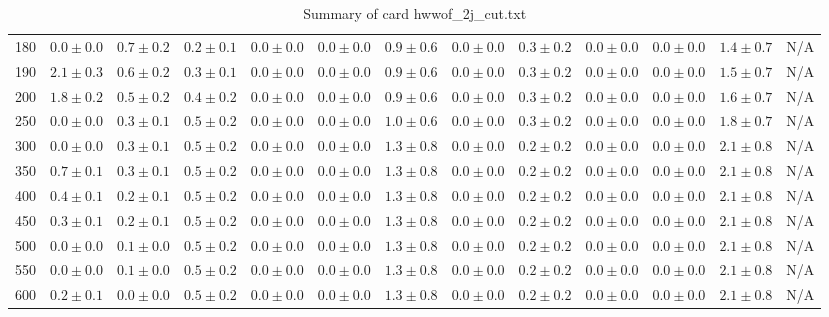\begin{table}
{\begin{center}
\begin{tabular}{l | c c | c c c c c c c c  | c c}
180 & $0.0\pm0.0$ & $0.7\pm0.2$ & $0.2\pm0.1$ & $0.0\pm0.0$ & $0.0\pm0.0$ & $0.9\pm0.6$ & $0.0\pm0.0$ & $0.3\pm0.2$ & $0.0\pm0.0$ & $0.0\pm0.0$ & $1.4\pm0.7$ & N/A \\
190 & $2.1\pm0.3$ & $0.6\pm0.2$ & $0.3\pm0.1$ & $0.0\pm0.0$ & $0.0\pm0.0$ & $0.9\pm0.6$ & $0.0\pm0.0$ & $0.3\pm0.2$ & $0.0\pm0.0$ & $0.0\pm0.0$ & $1.5\pm0.7$ & N/A \\
200 & $1.8\pm0.2$ & $0.5\pm0.2$ & $0.4\pm0.2$ & $0.0\pm0.0$ & $0.0\pm0.0$ & $0.9\pm0.6$ & $0.0\pm0.0$ & $0.3\pm0.2$ & $0.0\pm0.0$ & $0.0\pm0.0$ & $1.6\pm0.7$ & N/A \\
250 & $0.0\pm0.0$ & $0.3\pm0.1$ & $0.5\pm0.2$ & $0.0\pm0.0$ & $0.0\pm0.0$ & $1.0\pm0.6$ & $0.0\pm0.0$ & $0.3\pm0.2$ & $0.0\pm0.0$ & $0.0\pm0.0$ & $1.8\pm0.7$ & N/A \\
300 & $0.0\pm0.0$ & $0.3\pm0.1$ & $0.5\pm0.2$ & $0.0\pm0.0$ & $0.0\pm0.0$ & $1.3\pm0.8$ & $0.0\pm0.0$ & $0.2\pm0.2$ & $0.0\pm0.0$ & $0.0\pm0.0$ & $2.1\pm0.8$ & N/A \\
350 & $0.7\pm0.1$ & $0.3\pm0.1$ & $0.5\pm0.2$ & $0.0\pm0.0$ & $0.0\pm0.0$ & $1.3\pm0.8$ & $0.0\pm0.0$ & $0.2\pm0.2$ & $0.0\pm0.0$ & $0.0\pm0.0$ & $2.1\pm0.8$ & N/A \\
400 & $0.4\pm0.1$ & $0.2\pm0.1$ & $0.5\pm0.2$ & $0.0\pm0.0$ & $0.0\pm0.0$ & $1.3\pm0.8$ & $0.0\pm0.0$ & $0.2\pm0.2$ & $0.0\pm0.0$ & $0.0\pm0.0$ & $2.1\pm0.8$ & N/A \\
450 & $0.3\pm0.1$ & $0.2\pm0.1$ & $0.5\pm0.2$ & $0.0\pm0.0$ & $0.0\pm0.0$ & $1.3\pm0.8$ & $0.0\pm0.0$ & $0.2\pm0.2$ & $0.0\pm0.0$ & $0.0\pm0.0$ & $2.1\pm0.8$ & N/A \\
500 & $0.0\pm0.0$ & $0.1\pm0.0$ & $0.5\pm0.2$ & $0.0\pm0.0$ & $0.0\pm0.0$ & $1.3\pm0.8$ & $0.0\pm0.0$ & $0.2\pm0.2$ & $0.0\pm0.0$ & $0.0\pm0.0$ & $2.1\pm0.8$ & N/A \\
550 & $0.0\pm0.0$ & $0.1\pm0.0$ & $0.5\pm0.2$ & $0.0\pm0.0$ & $0.0\pm0.0$ & $1.3\pm0.8$ & $0.0\pm0.0$ & $0.2\pm0.2$ & $0.0\pm0.0$ & $0.0\pm0.0$ & $2.1\pm0.8$ & N/A \\
600 & $0.2\pm0.1$ & $0.0\pm0.0$ & $0.5\pm0.2$ & $0.0\pm0.0$ & $0.0\pm0.0$ & $1.3\pm0.8$ & $0.0\pm0.0$ & $0.2\pm0.2$ & $0.0\pm0.0$ & $0.0\pm0.0$ & $2.1\pm0.8$ & N/A \\
\hline
\end{tabular}
\end{center}
}
\caption{Summary of card hwwof\_2j\_cut.txt}
\end{table}

